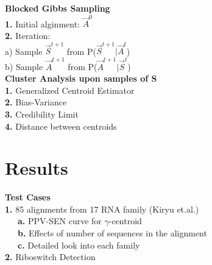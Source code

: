 \documentclass{beamer}
\begin{document}
\newpage
{\bf  Blocked Gibbs Sampling}\\
\vspace{1.0cm}
\textbf{1.} Initial alginment: $\vec A^{0}$\\
\vspace{0.5cm}
\textbf{2.} Iteration:\\
\vspace{0.2cm}
a) Sample $\vec S^{t+1}$ from P($\vec S^{t+1}|\vec A^{t}$)\\
\vspace{0.1cm}
b) Sample $\vec A^{t+1}$ from P($\vec A^{t+1}|\vec S^{t}$)\\
\newpage
{\bf  Cluster Analysis upon samples of S}\\
\vspace{1.0cm}
\textbf{1.} Generalized Centroid Estimator\\
\vspace{0.3cm}
\textbf{2.} Bias-Variance\\
\vspace{0.3cm}
\textbf{3.} Credibility Limit\\
\vspace{0.3cm}
\textbf{4.} Distance between centroids\\
\newpage
\section{Results}{\bf Test Cases}\\
\vspace{1.0cm}
\textbf{1.} 85 alignments from 17 RNA family (Kiryu et.al.)\\
\vspace{0.2cm}
\ \ \ \textbf{a.} PPV-SEN curve for $\gamma$-centroid\\
\vspace{0.2cm}
\ \ \ \textbf{b.} Effects of number of sequences in the alignment\\
\vspace{0.2cm}
\ \ \ \textbf{c.} Detailed look into each family\\
\vspace{0.5cm}
\textbf{2.} Riboswitch Detection\\
\end{document}
